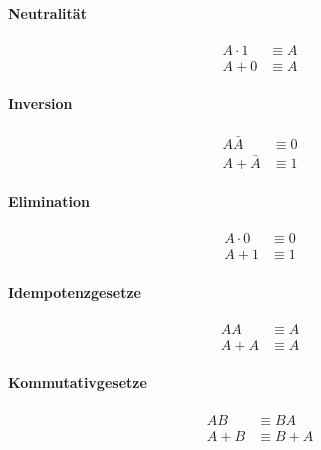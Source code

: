 \documentclass[../main.tex]{subfiles}
\begin{document}
        \paragraph{Neutralität}
            \begin{subequations}
                \begin{align}
                    A \cdot 1 &\equiv A\\
                    A + 0 &\equiv A
                \end{align}
            \end{subequations}
        
        \paragraph{Inversion}
            \begin{subequations}
                \begin{align}
                    A\bar{A} &\equiv 0\\
                    A + \bar{A} &\equiv 1
                \end{align}
            \end{subequations}
        
        \paragraph{Elimination}
            \begin{subequations}
                \begin{align}
                    A \cdot 0 &\equiv 0\\
                    A + 1 &\equiv 1
                \end{align}
            \end{subequations}
        
        \paragraph{Idempotenzgesetze}
            \begin{subequations}
                \begin{align}
                    AA &\equiv A\\
                    A + A &\equiv A
                \end{align}
            \end{subequations}
        
        \paragraph{Kommutativgesetze}
            \begin{subequations}
                \begin{align}
                    AB &\equiv BA\\
                    A + B &\equiv B + A
                \end{align}
            \end{subequations}
        
\end{document}
